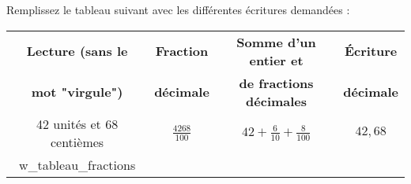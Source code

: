 \begin{exo}
    Remplissez le tableau suivant avec les différentes écritures demandées :
\end{exo}

\vspace{0.5cm}

{\centering
\renewcommand{\arraystretch}{2}
\begin{tabular}{|c|c|c|c|}
    \hline
    \textbf{Lecture (sans le} & \textbf{Fraction } &\textbf{Somme d'un entier et} &\textbf{\'Ecriture}  \\ 
    \textbf{mot "virgule")} & \textbf{décimale} &\textbf{de fractions décimales} &\textbf{décimale}  \\ 
    \hline
    42 unités et 68 centièmes & $\frac{4268}{100}$ & $42 + \frac{6}{10} + \frac{8}{100}$ &  $42{,}68$ \\ \hline
    {w_tableau_fractions} \\ \hline
\end{tabular}

}